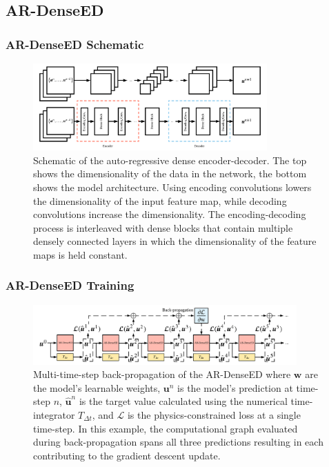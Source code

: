 \documentclass{beamer}
\theoremstyle{remark}
\begin{document}
\subsection{AR-DenseED}


\begin{frame}
\frametitle{AR-DenseED Schematic}
\begin{figure}[H]
    \centering
    \includegraphics[trim={0 0.25cm 0 0},clip, width=0.8\textwidth]{Fig01.png}
    \caption{Schematic of the auto-regressive dense encoder-decoder.     
    The top shows the dimensionality of the data in the network, the bottom shows the model architecture.
    Using encoding convolutions lowers the dimensionality of the input feature map, while decoding convolutions increase the dimensionality.
    The encoding-decoding process is interleaved with dense blocks that contain multiple densely connected layers in which the dimensionality of the feature maps is held constant.}
    \label{fig:ar-denseED}
\end{figure}
\end{frame}

\begin{frame}
\frametitle{AR-DenseED Training}
\begin{figure}[H]
    \centering
    \includegraphics[width=0.9\textwidth]{Fig03.png}
    \caption{Multi-time-step back-propagation of the AR-DenseED where $\textbf{w}$ are the model's learnable weights, $\bm{u}^{n}$ is the model's prediction at time-step $n$, $\hat{\bm{u}}^{n}$ is the target value calculated using the numerical time-integrator $T_{\Delta t}$, and $\mathcal{L}$ is the physics-constrained loss at a single time-step.
    In this example, the computational graph evaluated during back-propagation spans all three predictions resulting in each contributing to the gradient descent update.}
    \label{fig:multi-backprop}
\end{figure}

\end{frame}
\end{document}
